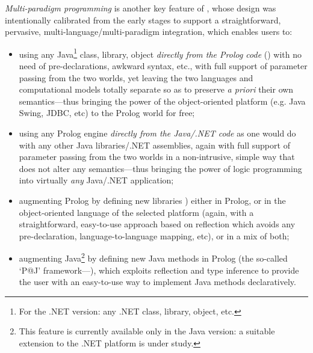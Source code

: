 \textit{Multi-paradigm programming} is another key feature of \tuprolog{}, whose design was intentionally calibrated from the early stages to support a straightforward, pervasive, multi-language/multi-paradigm integration, which enables users to:
\begin{itemize}
  \item using any Java\footnote{For the .NET version: any .NET class, library, object, etc.} class, library, object \emph{directly from the Prolog code}
  () with no need of pre-declarations, awkward syntax, etc., with full support of parameter passing from the two worlds, yet leaving the two languages and computational models totally separate so as to preserve \emph{a priori} their own semantics---thus bringing the power of the object-oriented platform (e.g. Java Swing, JDBC, etc) to the Prolog world for free;

  \item using any Prolog engine \emph{directly from the Java/.NET code} as one would
   do with any other Java libraries/.NET assemblies, again with full support of parameter passing from the two worlds in a non-intrusive, simple way that does not alter any semantics---thus bringing the power of logic programming into virtually \emph{any} Java/.NET application;

  \item augmenting Prolog by defining new libraries )
  either in Prolog, or in the object-oriented language of the selected platform (again, with a straightforward, easy-to-use approach based on reflection which avoids any pre-declaration, language-to-language mapping, etc), or in a mix of both;

  \item augmenting Java\footnote{This feature is currently available only in the Java version: a suitable extension to the .NET platform is under study.} by defining new Java methods in Prolog (the so-called `P@J' framework---), which exploits reflection and type inference to provide the user with an easy-to-use way to implement Java methods declaratively.
\end{itemize}


